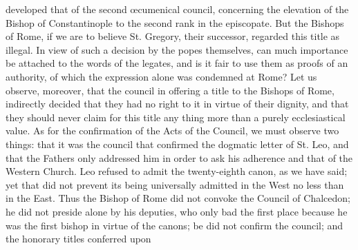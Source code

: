 developed that of the second œcumenical council, concerning the elevation of the Bishop of Constantinople to the second rank in the episcopate. But the Bishops of Rome, if we are to believe St. Gregory, their successor, regarded this title as illegal. In view of such a decision by the popes themselves, can much importance be attached to the words of the legates, and is it fair to use them as proofs of an authority, of which the expression alone was condemned at Rome? Let us observe, moreover, that the council in offering a title to the Bishops of Rome, indirectly decided that they had no right to it in virtue of their dignity, and that they should never claim for this title any thing more than a purely ecclesiastical value. As for the confirmation of the Acts of the Council, we must observe two things: that it was the council that confirmed the dogmatic letter of St. Leo, and that the Fathers only addressed him in order to ask his adherence and that of the Western Church. Leo refused to admit the twenty-eighth canon, as we have said; yet that did not prevent its being universally admitted in the West no less than in the East. Thus the Bishop of Rome did not convoke the Council of Chalcedon; he did not preside alone by his deputies, who only bad the first place because he was the first bishop in virtue of the canons; be did not confirm the council; and the honorary titles conferred upon

